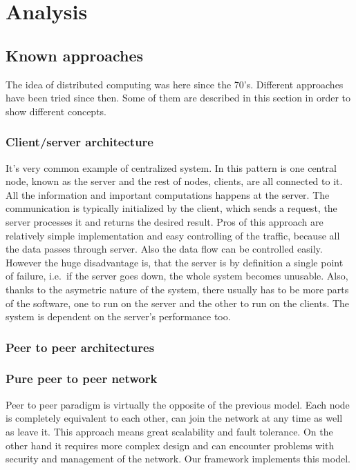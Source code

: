 \chapter{Analysis}\label{analysis}

\section{Known approaches}\label{known-approaches}

The idea of distributed computing was here since the 70's. Different
approaches have been tried since then. Some of them are described in
this section in order to show different concepts.

\subsection{Client/server architecture}\label{clientserver-architecture}

It's very common example of centralized system. In this pattern is one
central node, known as the server and the rest of nodes, clients, are
all connected to it. All the information and important computations
happens at the server. The communication is typically initialized by the
client, which sends a request, the server processes it and returns the
desired result. Pros of this approach are relatively simple
implementation and easy controlling of the traffic, because all the data
passes through server. Also the data flow can be controlled easily.
However the huge disadvantage is, that the server is by definition a
single point of failure, i.e.~if the server goes down, the whole system
becomes unusable. Also, thanks to the asymetric nature of the system,
there usually has to be more parts of the software, one to run on the
server and the other to run on the clients. The system is dependent on
the server's performance too.

\subsection{Peer to peer
architectures\citep{SupPeer}}\label{peer-to-peer-architecturessuppeer}

\subsection*{Pure peer to peer network}

Peer to peer paradigm is virtually the opposite of the previous model.
Each node is completely equivalent to each other, can join the network
at any time as well as leave it. This approach means great scalability
and fault tolerance. On the other hand it requires more complex design
and can encounter problems with security and management of the network.
Our framework implements this model.

